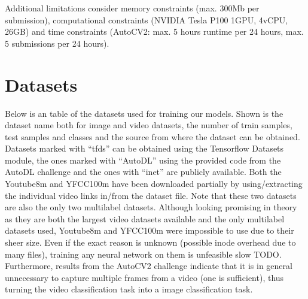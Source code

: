 \documentclass{article}
\begin{document}
%
Additional limitations consider memory constraints (max. 300Mb per submission), computational constraints (NVIDIA Tesla P100 1GPU, 4vCPU, 26GB) and time constraints (AutoCV2: max. 5 hours runtime per 24 hours, max. 5 submissions per 24 hours).


\section{Datasets}
\label{sec:datasets}
Below is an table of the datasets used for training our models. Shown is the dataset name both for image and video datasets, the number of train samples, test samples and classes and the source from where the dataset can be obtained. Datasets marked with ``tfds'' can be obtained using the Tensorflow Datasets module, the ones marked with ``AutoDL'' using the provided code from the AutoDL challenge and the ones with ``inet'' are publicly available. Both the Youtube8m and YFCC100m have been downloaded partially by using/extracting the individual video links in/from the dataset file. Note that these two datasets are also the only two multilabel datasets.
Although looking promising in theory as they are both the largest video datasets available and the only multilabel datasets used, Youtube8m and YFCC100m were impossible to use due to their sheer size. Even if the exact reason is unknown (possible inode overhead due to many files), training any neural network on them is unfeasible slow TODO.
Furthermore, results from the AutoCV2 challenge indicate that it is in general unnecessary to capture multiple frames from a video (one is sufficient), thus turning the video classification task into a image classification task.
\end{document}
